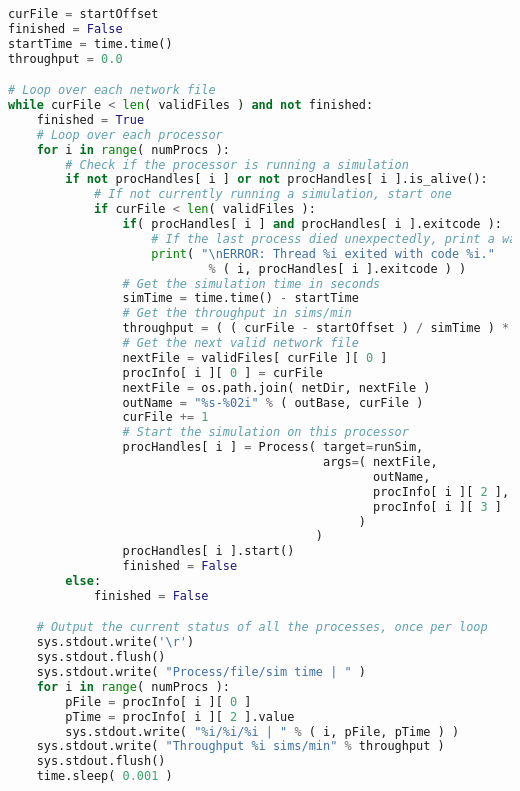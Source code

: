 \begin{lstlisting}[caption={Code for running concurrent simulations from supplied network files}, label={ap:simCode}, language=Python]
curFile = startOffset
finished = False
startTime = time.time()
throughput = 0.0

# Loop over each network file
while curFile < len( validFiles ) and not finished:
    finished = True
    # Loop over each processor
    for i in range( numProcs ):
        # Check if the processor is running a simulation
        if not procHandles[ i ] or not procHandles[ i ].is_alive():
            # If not currently running a simulation, start one
            if curFile < len( validFiles ):
                if( procHandles[ i ] and procHandles[ i ].exitcode ):
                    # If the last process died unexpectedly, print a warning
                    print( "\nERROR: Thread %i exited with code %i."
                            % ( i, procHandles[ i ].exitcode ) )
                # Get the simulation time in seconds
                simTime = time.time() - startTime
                # Get the throughput in sims/min
                throughput = ( ( curFile - startOffset ) / simTime ) * 60.0
                # Get the next valid network file
                nextFile = validFiles[ curFile ][ 0 ]
                procInfo[ i ][ 0 ] = curFile      
                nextFile = os.path.join( netDir, nextFile )
                outName = "%s-%02i" % ( outBase, curFile )
                curFile += 1
                # Start the simulation on this processor
                procHandles[ i ] = Process( target=runSim, 
                                            args=( nextFile, 
                                                   outName, 
                                                   procInfo[ i ][ 2 ],
                                                   procInfo[ i ][ 3 ]
                                                 )
                                           )
                procHandles[ i ].start()
                finished = False
        else:
            finished = False

    # Output the current status of all the processes, once per loop
    sys.stdout.write('\r')
    sys.stdout.flush()
    sys.stdout.write( "Process/file/sim time | " )
    for i in range( numProcs ):
        pFile = procInfo[ i ][ 0 ]
        pTime = procInfo[ i ][ 2 ].value
        sys.stdout.write( "%i/%i/%i | " % ( i, pFile, pTime ) )
    sys.stdout.write( "Throughput %i sims/min" % throughput )
    sys.stdout.flush()
    time.sleep( 0.001 )
\end{lstlisting}